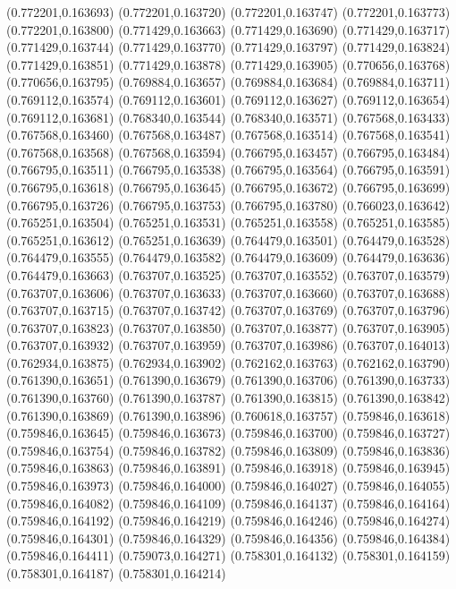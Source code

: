 (0.772201,0.163693)
(0.772201,0.163720)
(0.772201,0.163747)
(0.772201,0.163773)
(0.772201,0.163800)
(0.771429,0.163663)
(0.771429,0.163690)
(0.771429,0.163717)
(0.771429,0.163744)
(0.771429,0.163770)
(0.771429,0.163797)
(0.771429,0.163824)
(0.771429,0.163851)
(0.771429,0.163878)
(0.771429,0.163905)
(0.770656,0.163768)
(0.770656,0.163795)
(0.769884,0.163657)
(0.769884,0.163684)
(0.769884,0.163711)
(0.769112,0.163574)
(0.769112,0.163601)
(0.769112,0.163627)
(0.769112,0.163654)
(0.769112,0.163681)
(0.768340,0.163544)
(0.768340,0.163571)
(0.767568,0.163433)
(0.767568,0.163460)
(0.767568,0.163487)
(0.767568,0.163514)
(0.767568,0.163541)
(0.767568,0.163568)
(0.767568,0.163594)
(0.766795,0.163457)
(0.766795,0.163484)
(0.766795,0.163511)
(0.766795,0.163538)
(0.766795,0.163564)
(0.766795,0.163591)
(0.766795,0.163618)
(0.766795,0.163645)
(0.766795,0.163672)
(0.766795,0.163699)
(0.766795,0.163726)
(0.766795,0.163753)
(0.766795,0.163780)
(0.766023,0.163642)
(0.765251,0.163504)
(0.765251,0.163531)
(0.765251,0.163558)
(0.765251,0.163585)
(0.765251,0.163612)
(0.765251,0.163639)
(0.764479,0.163501)
(0.764479,0.163528)
(0.764479,0.163555)
(0.764479,0.163582)
(0.764479,0.163609)
(0.764479,0.163636)
(0.764479,0.163663)
(0.763707,0.163525)
(0.763707,0.163552)
(0.763707,0.163579)
(0.763707,0.163606)
(0.763707,0.163633)
(0.763707,0.163660)
(0.763707,0.163688)
(0.763707,0.163715)
(0.763707,0.163742)
(0.763707,0.163769)
(0.763707,0.163796)
(0.763707,0.163823)
(0.763707,0.163850)
(0.763707,0.163877)
(0.763707,0.163905)
(0.763707,0.163932)
(0.763707,0.163959)
(0.763707,0.163986)
(0.763707,0.164013)
(0.762934,0.163875)
(0.762934,0.163902)
(0.762162,0.163763)
(0.762162,0.163790)
(0.761390,0.163651)
(0.761390,0.163679)
(0.761390,0.163706)
(0.761390,0.163733)
(0.761390,0.163760)
(0.761390,0.163787)
(0.761390,0.163815)
(0.761390,0.163842)
(0.761390,0.163869)
(0.761390,0.163896)
(0.760618,0.163757)
(0.759846,0.163618)
(0.759846,0.163645)
(0.759846,0.163673)
(0.759846,0.163700)
(0.759846,0.163727)
(0.759846,0.163754)
(0.759846,0.163782)
(0.759846,0.163809)
(0.759846,0.163836)
(0.759846,0.163863)
(0.759846,0.163891)
(0.759846,0.163918)
(0.759846,0.163945)
(0.759846,0.163973)
(0.759846,0.164000)
(0.759846,0.164027)
(0.759846,0.164055)
(0.759846,0.164082)
(0.759846,0.164109)
(0.759846,0.164137)
(0.759846,0.164164)
(0.759846,0.164192)
(0.759846,0.164219)
(0.759846,0.164246)
(0.759846,0.164274)
(0.759846,0.164301)
(0.759846,0.164329)
(0.759846,0.164356)
(0.759846,0.164384)
(0.759846,0.164411)
(0.759073,0.164271)
(0.758301,0.164132)
(0.758301,0.164159)
(0.758301,0.164187)
(0.758301,0.164214)
